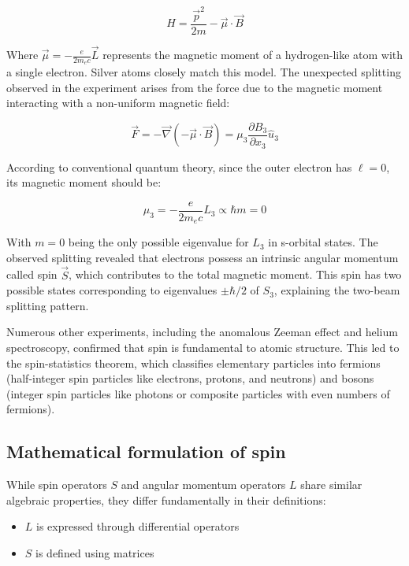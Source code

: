 \documentclass[italian]{HKNdocument}
\begin{document}
\begin{equation}
H=\frac{\vec{p}^{2}}{2 m}-\vec{\mu} \cdot \vec{B}
\end{equation}

Where $\vec{\mu}=-\frac{e}{2 m_{e} c} \vec{L}$ represents the magnetic moment of a hydrogen-like atom with a single electron. Silver atoms closely match this model. The unexpected splitting observed in the experiment arises from the force due to the magnetic moment interacting with a non-uniform magnetic field:

\begin{equation}
\vec{F}=-\vec{\nabla}(-\vec{\mu} \cdot \vec{B})=\mu_{3} \frac{\partial B_{3}}{\partial x_{3}} \hat{u}_{3}
\end{equation}

According to conventional quantum theory, since the outer electron has $\ell=0$, its magnetic moment should be:

\begin{equation}
\mu_{3}=-\frac{e}{2 m_{e} c} L_{3} \propto \hbar m=0
\end{equation}

With $m=0$ being the only possible eigenvalue for $L_3$ in s-orbital states. The observed splitting revealed that electrons possess an intrinsic angular momentum called spin $\vec{S}$, which contributes to the total magnetic moment. This spin has two possible states corresponding to eigenvalues $\pm\hbar/2$ of $S_3$, explaining the two-beam splitting pattern.

Numerous other experiments, including the anomalous Zeeman effect and helium spectroscopy, confirmed that spin is fundamental to atomic structure. This led to the spin-statistics theorem, which classifies elementary particles into fermions (half-integer spin particles like electrons, protons, and neutrons) and bosons (integer spin particles like photons or composite particles with even numbers of fermions).

\subsection{Mathematical formulation of spin}
While spin operators $S$ and angular momentum operators $L$ share similar algebraic properties, they differ fundamentally in their definitions:

\begin{itemize}
  \item $L$ is expressed through differential operators
  \item $S$ is defined using matrices
\end{itemize}
\end{document}
